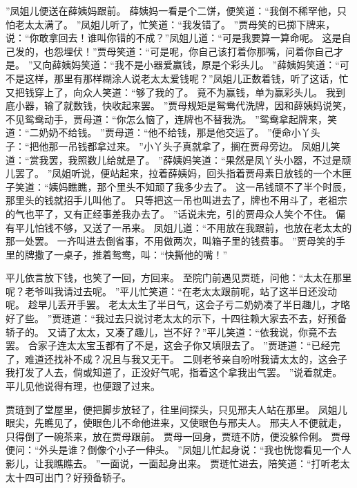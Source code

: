 ”凤姐儿便送在薛姨妈跟前。
薛姨妈一看是个二饼，便笑道：“我倒不稀罕他，只怕老太太满了。
”凤姐儿听了，忙笑道：“我发错了。
”贾母笑的已掷下牌来，说：“你敢拿回去！谁叫你错的不成？”凤姐儿道：“可是我要算一算命呢。
这是自己发的，也怨埋伏！”贾母笑道：“可是呢，你自己该打着你那嘴，问着你自己才是。
”又向薛姨妈笑道：“我不是小器爱赢钱，原是个彩头儿。
”薛姨妈笑道：“可不是这样，那里有那样糊涂人说老太太爱钱呢？”凤姐儿正数着钱，听了这话，忙又把钱穿上了，向众人笑道：“够了我的了。
竟不为赢钱，单为赢彩头儿。
我到底小器，输了就数钱，快收起来罢。
”贾母规矩是鸳鸯代洗牌，因和薛姨妈说笑，不见鸳鸯动手，贾母道：“你怎么恼了，连牌也不替我洗。
”鸳鸯拿起牌来，笑道：“二奶奶不给钱。
”贾母道：“他不给钱，那是他交运了。
”便命小丫头子：“把他那一吊钱都拿过来。
”小丫头子真就拿了，搁在贾母旁边。
凤姐儿笑道：“赏我罢，我照数儿给就是了。
”薛姨妈笑道：“果然是凤丫头小器，不过是顽儿罢了。
”凤姐听说，便站起来，拉着薛姨妈，回头指着贾母素日放钱的一个木匣子笑道：“姨妈瞧瞧，那个里头不知顽了我多少去了。
这一吊钱顽不了半个时辰，那里头的钱就招手儿叫他了。
只等把这一吊也叫进去了，牌也不用斗了，老祖宗的气也平了，又有正经事差我办去了。
”话说未完，引的贾母众人笑个不住。
偏有平儿怕钱不够，又送了一吊来。
凤姐儿道：“不用放在我跟前，也放在老太太的那一处罢。
一齐叫进去倒省事，不用做两次，叫箱子里的钱费事。
”贾母笑的手里的牌撒了一桌子，推着鸳鸯，叫：“快撕他的嘴！”\par
平儿依言放下钱，也笑了一回，方回来。
至院门前遇见贾琏，问他：“太太在那里呢？老爷叫我请过去呢。
”平儿忙笑道：“在老太太跟前呢，站了这半日还没动呢。
趁早儿丢开手罢。
老太太生了半日气，这会子亏二奶奶凑了半日趣儿，才略好了些。
”贾琏道：“我过去只说讨老太太的示下，十四往赖大家去不去，好预备轿子的。
又请了太太，又凑了趣儿，岂不好？”平儿笑道：“依我说，你竟不去罢。
合家子连太太宝玉都有了不是，这会子你又填限去了。
”贾琏道：“已经完了，难道还找补不成？况且与我又无干。
二则老爷亲自吩咐我请太太的，这会子我打发了人去，倘或知道了，正没好气呢，指着这个拿我出气罢。
”说着就走。
平儿见他说得有理，也便跟了过来。
\par
贾琏到了堂屋里，便把脚步放轻了，往里间探头，只见邢夫人站在那里。
凤姐儿眼尖，先瞧见了，使眼色儿不命他进来，又使眼色与邢夫人。
邢夫人不便就走，只得倒了一碗茶来，放在贾母跟前。
贾母一回身，贾琏不防，便没躲伶俐。
贾母便问：“外头是谁？倒像个小子一伸头。
”凤姐儿忙起身说：“我也恍惚看见一个人影儿，让我瞧瞧去。
”一面说，一面起身出来。
贾琏忙进去，陪笑道：“打听老太太十四可出门？好预备轿子。
